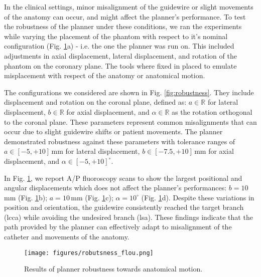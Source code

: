 In the clinical settings, minor misalignment of the guidewire or slight movements of the anatomy can occur, and might affect the planner's performance. To test the robustness of the planner under these conditions, we ran the experiments while varying the placement of the phantom with respect to it's nominal configuration (Fig. \ref{fig:robustness_flou}a) - i.e. the one the planner was run on. This included adjustments in axial displacement, lateral displacement, and rotation of the phantom on the coronary plane. The tools where fixed in placed to emulate misplacement with respect of the anatomy or anatomical motion.

The configurations we considered are shown in Fig. \ref{fig:robustness}. They include displacement and rotation on the coronal plane, defined as: $a\in \mathbb{R}$ for lateral displacement, $b\in \mathbb{R}$ for axial displacement, and  $\alpha\in \mathbb{R}$ as the rotation orthogonal to the coronal plane. These parameters represent common misalignments that can occur due to slight guidewire shifts or patient movements. The planner demonstrated robustness against these parameters with tolerance ranges of $a \in [-5, +10]$\,mm for lateral displacement, $b \in [-7.5, +10]$\,mm for axial displacement, and $\alpha \in [-5, +10]^\circ$. 

In Fig. \ref{fig:robustness_flou}, we report A/P fluoroscopy scans to show the largest positional and angular displacements which does not affect the planner's performances: $b = 10$\,mm (Fig. \ref{fig:robustness_flou}b); $a = 10$\,mm (Fig. \ref{fig:robustness_flou}c); $\alpha = 10^\circ$ (Fig. \ref{fig:robustness_flou}d). Despite these variations in position and orientation, the guidewire consistently reached the target branch (\gls{lcca}) while avoiding the undesired branch (\gls{lsa}). 
These findings indicate that the path provided by the planner can effectively adapt to misalignment of the catheter and movements of the anatomy.

\begin{figure}[t] 
    \centering
    \texttt{[image: figures/robutsness\_flou.png]}
    \caption{Results of planner robustness towards anatomical motion.}
    \label{fig:robustness_flou}
\end{figure}


